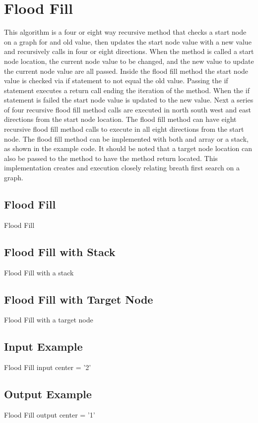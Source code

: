 \section{Flood Fill}
This algorithm is a four or eight way recursive method that checks a start node on a graph for and old value, then updates the start node value with a new value and recursively calls in four or eight directions.
When the method is called a start node location, the current node value to be changed, and the new value to update the current node value are all passed.
Inside the flood fill method the start node value is checked via if statement to not equal the old value.
Passing the if statement executes a return call ending the iteration of the method.
When the if statement is failed the start node value is updated to the new value.     
Next a series of four recursive flood fill method calls are executed in north south west and east directions from the start node location. 
The flood fill method can have eight recursive flood fill method calls to execute in all eight directions from the start node. 
The flood fill method can be implemented with both and array or a stack, as shown in the example code.
It should be noted that a target node location can also be passed to the method to have the method return located. 
This implementation creates and execution closely relating breath first search on a graph. 

\subsection{Flood Fill}
Flood Fill 

\subsection{Flood Fill with Stack}
Flood Fill with a stack

\subsection{Flood Fill with Target Node}
Flood Fill with a target node

\subsection{Input Example}
Flood Fill input center = '2'

\subsection{Output Example}
Flood Fill output center = '1'

